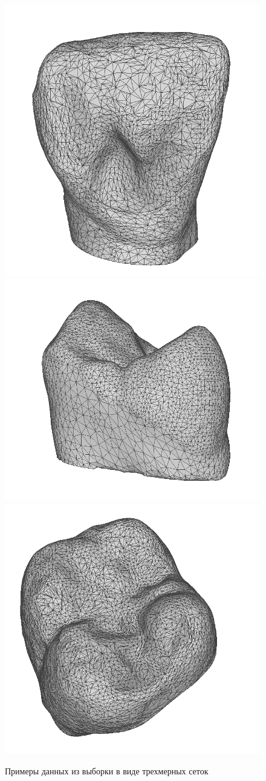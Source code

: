 \begin{figure}[ht!]
    \includegraphics[width=.3\textwidth]{images/snapshot104.png}\hfill
    \includegraphics[width=.3\textwidth]{images/snapshot200.png}\hfill
    \includegraphics[width=.3\textwidth]{images/snapshot206.png}
    \label{fig:ex2}
    \caption{Примеры данных из выборки в виде трехмерных сеток}
\end{figure}
